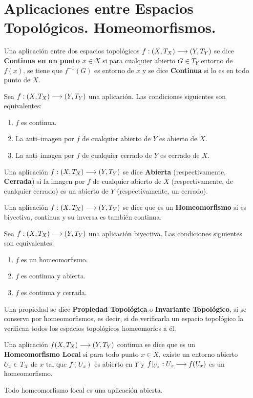 \documentclass[cursovd_portada.tex]{subfiles}
\begin{document}
\section{Aplicaciones entre Espacios Topológicos. Ho\-meo\-mor\-fis\-mos.}
\begin{defi}
Una aplicación entre dos espacios topológicos $f:(X,T_X)\longrightarrow (Y,T_Y)$ se dice {\bf Continua en un punto $x\in X$}
si para cualquier abierto $G\in T_Y$ entorno de $f(x)$, se tiene que $f^{-1}(G)$ es entorno de $x$ y se dice {\bf
Continua} si lo es en todo punto de $X$.
\end{defi}
\begin{teorema}
Sea $f:(X,T_X)\longrightarrow (Y,T_Y)$ una aplicación. Las condiciones siguientes son equivalentes:
\begin{enumerate}
\item $f$ es continua.
\item La anti--imagen por $f$ de cualquier abierto de $Y$ es abierto de $X$.
\item La anti--imagen por $f$ de cualquier cerrado de $Y$ es cerrado de $X$.
\end{enumerate}
\end{teorema}
\begin{defi}
Una aplicación $f:(X,T_X)\longrightarrow (Y,T_Y)$ se dice {\bf Abierta} (respectivamente, {\bf Cerrada}) si la imagen por $f$
de cualquier abierto de $X$ (respectivamente, de cualquier cerrado) es un abierto de $Y$ (respectivamente, un
cerrado).
\end{defi}
\begin{defi} Una aplicación $f:(X,T_X)\longrightarrow (Y,T_Y)$ se dice que es un {\bf Homeomorfismo} si es biyectiva, continua
y su inversa es también continua.
\end{defi}
\begin{teorema}
Sea $f:(X,T_X)\longrightarrow (Y,T_Y)$ una aplicación biyectiva. Las condiciones siguientes son equivalentes:
\begin{enumerate}
\item $f$ es un homeomorfismo.
\item $f$ es continua y abierta.
\item $f$ es continua y cerrada.
\end{enumerate}
\end{teorema}
\begin{defi} Una propiedad se dice {\bf Propiedad Topológica} o {\bf Invariante Topológico}, si se conserva por
homeomorfismos, es decir, si de verificarla un espacio topológico la verifican todos los espacios topológicos
homeomorfos a él.
\end{defi}
\begin{defi}
Una aplicación $f(X,T_X)\longrightarrow (Y,T_Y)$ continua se dice que es un {\bf Homeomorfismo Local} si para todo punto $x\in
X$, existe un entorno abierto $U_x\in T_X$ de $x$ tal que $f(U_x)$ es abierto en $Y$ y $f|_{U_x}:U_x\longrightarrow f(U_x)$ es
un homeomorfismo.
\end{defi}
\begin{prop}
Todo homeomorfismo local es una aplicación abierta.
\end{prop}
\end{document}

